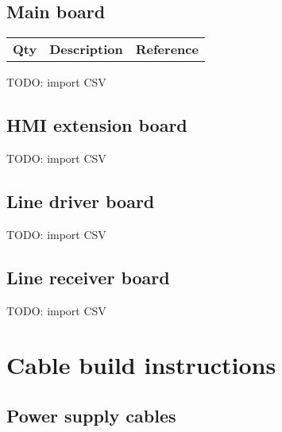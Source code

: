 \subsection{Main board}
\label{sec:bom-mainboard}

\begin{tabular}{m{0.5cm} m{9.3cm} m{4cm}}
\bfseries Qty  & \bfseries Description & \bfseries Reference \\



\end{tabular}

TODO: import CSV

\subsection{HMI extension board}
\label{sec:bom-hmiext}
TODO: import CSV

\subsection{Line driver board}
\label{sec:bom-linedrv}
TODO: import CSV

\subsection{Line receiver board}
\label{sec:bom-linerec}
TODO: import CSV

\section{Cable build instructions}
\label{sec:cableBuildInstructions}

\subsection{Power supply cables}

